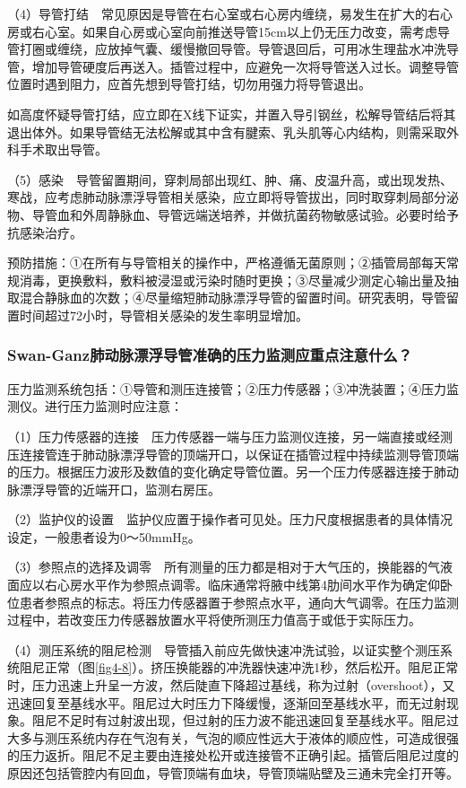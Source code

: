 （4）导管打结　常见原因是导管在右心室或右心房内缠绕，易发生在扩大的右心房或右心室。如果自心房或心室向前推送导管15cm以上仍无压力改变，需考虑导管打圈或缠绕，应放掉气囊、缓慢撤回导管。导管退回后，可用冰生理盐水冲洗导管，增加导管硬度后再送入。插管过程中，应避免一次将导管送入过长。调整导管位置时遇到阻力，应首先想到导管打结，切勿用强力将导管退出。

如高度怀疑导管打结，应立即在X线下证实，并置入导引钢丝，松解导管结后将其退出体外。如果导管结无法松解或其中含有腱索、乳头肌等心内结构，则需采取外科手术取出导管。

（5）感染　导管留置期间，穿刺局部出现红、肿、痛、皮温升高，或出现发热、寒战，应考虑肺动脉漂浮导管相关感染，应立即将导管拔出，同时取穿刺局部分泌物、导管血和外周静脉血、导管远端送培养，并做抗菌药物敏感试验。必要时给予抗感染治疗。

预防措施：①在所有与导管相关的操作中，严格遵循无菌原则；②插管局部每天常规消毒，更换敷料，敷料被浸湿或污染时随时更换；③尽量减少测定心输出量及抽取混合静脉血的次数；④尽量缩短肺动脉漂浮导管的留置时间。研究表明，导管留置时间超过72小时，导管相关感染的发生率明显增加。

\subsubsection{Swan-Ganz肺动脉漂浮导管准确的压力监测应重点注意什么？}

压力监测系统包括：①导管和测压连接管；②压力传感器；③冲洗装置；④压力监测仪。进行压力监测时应注意：

（1）压力传感器的连接　压力传感器一端与压力监测仪连接，另一端直接或经测压连接管连于肺动脉漂浮导管的顶端开口，以保证在插管过程中持续监测导管顶端的压力。根据压力波形及数值的变化确定导管位置。另一个压力传感器连接于肺动脉漂浮导管的近端开口，监测右房压。

（2）监护仪的设置　监护仪应置于操作者可见处。压力尺度根据患者的具体情况设定，一般患者设为0～50mmHg。

（3）参照点的选择及调零　所有测量的压力都是相对于大气压的，换能器的气液面应以右心房水平作为参照点调零。临床通常将腋中线第4肋间水平作为确定仰卧位患者参照点的标志。将压力传感器置于参照点水平，通向大气调零。在压力监测过程中，若改变压力传感器放置水平将使所测压力值高于或低于实际压力。

（4）测压系统的阻尼检测　导管插入前应先做快速冲洗试验，以证实整个测压系统阻尼正常（图\ref{fig4-8}）。挤压换能器的冲洗器快速冲洗1秒，然后松开。阻尼正常时，压力迅速上升呈一方波，然后陡直下降超过基线，称为过射（overshoot），又迅速回复至基线水平。阻尼过大时压力下降缓慢，逐渐回至基线水平，而无过射现象。阻尼不足时有过射波出现，但过射的压力波不能迅速回复至基线水平。阻尼过大多与测压系统内存在气泡有关，气泡的顺应性远大于液体的顺应性，可造成很强的压力返折。阻尼不足主要由连接处松开或连接管不正确引起。插管后阻尼过度的原因还包括管腔内有回血，导管顶端有血块，导管顶端贴壁及三通未完全打开等。

